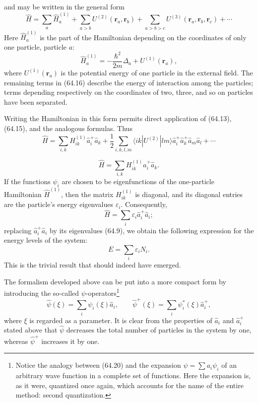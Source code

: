 and may be written in the general form
\begin{equation}
 \hat H=\sum_a\hat H_a^{(1)}+\sum_{a>b}U^{(2)}(\mathbf r_a,\mathbf r_b)
 +\sum_{a>b>c}U^{(3)}(\mathbf r_a,\mathbf r_b,\mathbf r_c)+\cdots
 \tag{64.16}
\end{equation}
Here $\hat H_a^{(1)}$ is the part of the Hamiltonian depending on the
coordinates of only one particle, particle $a$:
\begin{equation}
 \hat H_a^{(1)}=-\frac{\hbar^2}{2m}\Delta_a+U^{(1)}(\mathbf r_a),
 \tag{64.17}
\end{equation}
where $U^{(1)}(\mathbf r_a)$ is the potential energy of one particle in the
external field. The remaining terms in (64.16) describe the energy of
interaction among the particles; terms depending respectively on the
coordinates of two, three, and so on particles have been separated.

Writing the Hamiltonian in this form permits direct application of (64.13),
(64.15), and the analogous formulas. Thus
\begin{equation}
 \hat H=\sum_{i,k}H_{ik}^{(1)}\hat a_i^+\hat a_k
 +\frac12\sum_{i,k,l,m}\langle ik|U^{(2)}|lm\rangle
 \hat a_i^+\hat a_k^+\hat a_m\hat a_l+\cdots
 \tag{64.18}
\end{equation}



\begin{equation}
 \hat H=\sum_{i,k}H_{ik}^{(1)}\hat a_i^+\hat a_k.
 \tag{64.19}
\end{equation}
If the functions $\psi_i$ are chosen to be eigenfunctions of the
one-particle Hamiltonian $\hat H^{(1)}$, then the matrix $H_{ik}^{(1)}$ is
diagonal, and its diagonal entries are the particle's energy eigenvalues
$\varepsilon_i$. Consequently,
\[
 \hat H=\sum_i\varepsilon_i\hat a_i^+\hat a_i;
\]
replacing $\hat a_i^+\hat a_i$ by its eigenvalues (64.9), we obtain the
following expression for the energy levels of the system:
\[
 E=\sum_i\varepsilon_iN_i.
\]
This is the trivial result that should indeed have emerged.

The formalism developed above can be put into a more compact form by
introducing the so-called $\psi$-operators\footnote{Notice the analogy between
(64.20) and the expansion $\psi=\sum a_i\psi_i$ of an arbitrary wave function
in a complete set of functions. Here the expansion is, as it were, quantized
once again, which accounts for the name of the entire method: second
quantization.}
\begin{equation}
 \hat\psi(\xi)=\sum_i\psi_i(\xi)\hat a_i,\qquad
 \hat\psi^+(\xi)=\sum_i\psi_i^*(\xi)\hat a_i^+,
 \tag{64.20}
\end{equation}
where $\xi$ is regarded as a parameter. It is clear from the properties of
$\hat a_i$ and $\hat a_i^+$ stated above that $\hat\psi$ decreases the total
number of particles in the system by one, whereas $\hat\psi^+$ increases it
by one.

